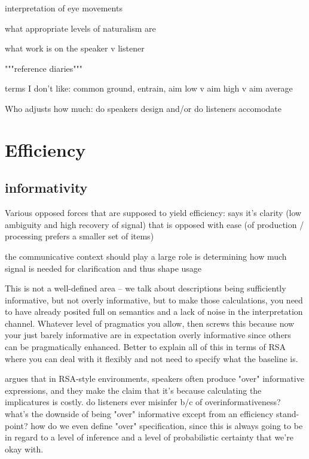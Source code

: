 \documentclass[]{article}
\begin{document}
interpretation of eye movements

what appropriate levels of naturalism are

what work is on the speaker v listener

"""reference diaries"""

terms I don't like: common ground, entrain, aim low v aim high v aim average

Who adjusts how much: do speakers design and/or do listeners accomodate








\section{Efficiency}

\subsection{informativity}


Various opposed forces that are supposed to yield efficiency: \cite{piantadosi2012} says it's clarity (low ambiguity and high recovery of signal) that is opposed with ease (of production / processing prefers a smaller set of items) 

the communicative context should play a large role is determining how much signal is needed for clarification and thus shape usage 

This is not a well-defined area -- we talk about descriptions being sufficiently informative, but not overly informative, but to make those calculations, you need to have already posited full on semantics and a lack of noise in the interpretation channel. Whatever level of pragmatics you allow, then screws this because now your just barely informative are in expectation overly informative since others can be pragmatically enhanced. Better to explain all of this in terms of RSA where you can deal with it flexibly and not need to specify what the baseline is. 

\cite{baumann2014} argues that in RSA-style environments, speakers often produce "over" informative expressions, and they make the claim that it's because calculating the implicatures is costly.  do listeners ever misinfer b/c of overinformativeness? what's the downside of being "over" informative except from an efficiency stand-point? how do we even define "over" specification, since this is always going to be in regard to a level of inference and a level of probabilistic certainty that we're okay with. 
\end{document}
